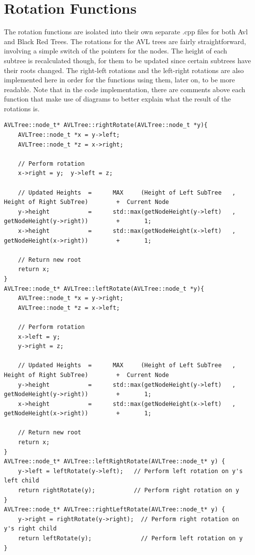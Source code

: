 \documentclass[12pt, a4paper]{report}
\begin{document}
\section{Rotation Functions}
The rotation functions are isolated into their own separate .cpp files for both Avl and Black Red Trees. The rotations for the AVL trees are fairly straightforward, involving a simple switch of the pointers for the nodes. The height of each subtree is recalculated though, for them to be updated since certain subtrees have their roots changed. The right-left rotations and the left-right rotations are also implemented here in order for the functions using them, later on, to be more readable. Note that in the code implementation, there are comments above each function that make use of diagrams to better explain what the result of the rotations is.
\begin{verbatim}
AVLTree::node_t* AVLTree::rightRotate(AVLTree::node_t *y){  
    AVLTree::node_t *x = y->left;  
    AVLTree::node_t *z = x->right;  
  
    // Perform rotation  
    x->right = y;  y->left = z;  
  
    // Updated Heights  =      MAX     (Height of Left SubTree   ,  Height of Right SubTree)        +  Current Node
    y->height           =      std::max(getNodeHeight(y->left)   ,  getNodeHeight(y->right))        +       1;  
    x->height           =      std::max(getNodeHeight(x->left)   ,  getNodeHeight(x->right))        +       1;  
  
    // Return new root  
    return x;  
}
AVLTree::node_t* AVLTree::leftRotate(AVLTree::node_t *y){  
    AVLTree::node_t *x = y->right;  
    AVLTree::node_t *z = x->left;  
  
    // Perform rotation  
    x->left = y;  
    y->right = z;  
  
    // Updated Heights  =      MAX     (Height of Left SubTree   ,  Height of Right SubTree)        +  Current Node
    y->height           =      std::max(getNodeHeight(y->left)   ,  getNodeHeight(y->right))        +       1;  
    x->height           =      std::max(getNodeHeight(x->left)   ,  getNodeHeight(x->right))        +       1;    
  
    // Return new root  
    return x;  
}  
AVLTree::node_t* AVLTree::leftRightRotate(AVLTree::node_t* y) {
    y->left = leftRotate(y->left);   // Perform left rotation on y's left child
    return rightRotate(y);           // Perform right rotation on y
}
AVLTree::node_t* AVLTree::rightLeftRotate(AVLTree::node_t* y) {
    y->right = rightRotate(y->right);  // Perform right rotation on y's right child
    return leftRotate(y);              // Perform left rotation on y
}
\end{verbatim}
\end{document}
